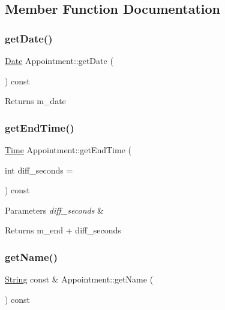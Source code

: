 \subsection{Member Function Documentation}
\mbox{\label{classAppointment_ac4f82720deaa4daf6679d1c60fadfb67}} 
\subsubsection{\texorpdfstring{get\+Date()}{getDate()}}
{\footnotesize\ttfamily \hyperlink{classDate}{Date} Appointment\+::get\+Date (\begin{DoxyParamCaption}{ }\end{DoxyParamCaption}) const}

\begin{DoxyReturn}{Returns}
m\+\_\+date 
\end{DoxyReturn}
\mbox{\label{classAppointment_a5ba3b128ad963c9676af3fb199b98613}} 
\subsubsection{\texorpdfstring{get\+End\+Time()}{getEndTime()}}
{\footnotesize\ttfamily \hyperlink{classTime}{Time} Appointment\+::get\+End\+Time (\begin{DoxyParamCaption}\item[{int}]{diff\+\_\+seconds = {} }\end{DoxyParamCaption}) const}


\begin{DoxyParams}{Parameters}
{\em diff\+\_\+seconds} & \\
\hline
\end{DoxyParams}
\begin{DoxyReturn}{Returns}
m\+\_\+end + diff\+\_\+seconds 
\end{DoxyReturn}
\mbox{\label{classAppointment_ab2cbd469ff67c37c34a91c02a1ba9d35}} 
\subsubsection{\texorpdfstring{get\+Name()}{getName()}}
{\footnotesize\ttfamily \hyperlink{classString}{String} const  \& Appointment\+::get\+Name (\begin{DoxyParamCaption}{ }\end{DoxyParamCaption}) const}

